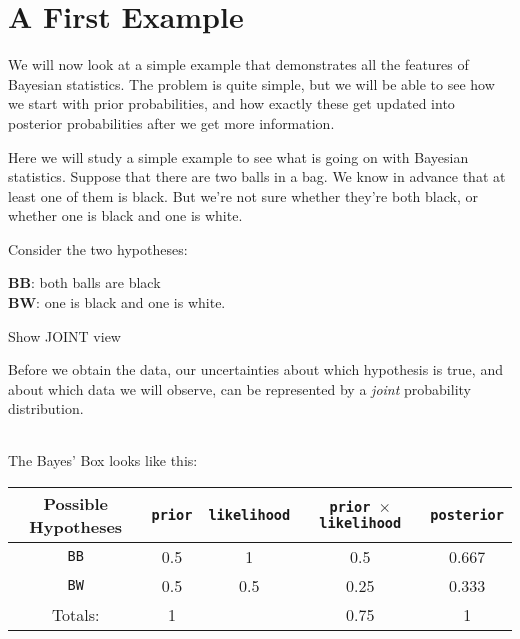 \chapter{A First Example}
We will now look at a simple example that demonstrates all the features of
Bayesian statistics. The problem is quite simple, but we will be able to see
how we start with prior probabilities, and how exactly these get updated
into posterior probabilities after we get more information.


Here we will study a simple example to see what is going on with Bayesian
statistics. Suppose that there are two balls in a bag. We know in advance
that at least one of them is black. But we're not sure whether they're both
black, or whether one is black and one is white.

Consider the two hypotheses:

{\bf BB}: both balls are black\\
{\bf BW}: one is black and one is white.



Show JOINT view

Before we obtain the data, our uncertainties about which hypothesis is true,
and about which data we will observe, can be represented by a {\it joint}
probability distribution.

\begin{table}
\begin{center}
\begin{tabular}{|c|c|c|}
\hline
\hline
\end{tabular}
\end{center}
\end{table}


The Bayes' Box looks like this:
\begin{table}[h!]
\begin{center}
\begin{tabular}{|c|c|c|c|c|}
\hline
{\bf Possible Hypotheses} & {\tt prior} & {\tt likelihood} &
{\tt prior $\times$ likelihood} & {\tt posterior}\\
\hline
{\tt BB} & 0.5 & 1   & 0.5  & 0.667\\
{\tt BW} & 0.5 & 0.5 & 0.25 & 0.333\\
\hline
Totals: & 1 & & 0.75 & 1\\
\hline
\end{tabular}
\end{center}
\end{table}

